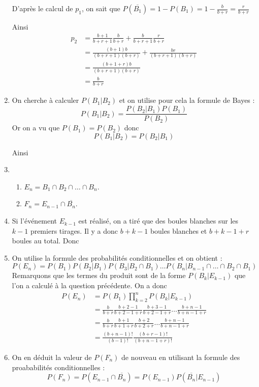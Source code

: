 \begin{exercice}
\begin{correction}
\begin{enumerate}
D'après le calcul de $p_1$, on sait que $P(\overline{B_1})= 1-P(B_1) =1-\frac{b}{b+r}= \frac{r}{b+r}$

Ainsi 
\begin{align*}
p_2&=\frac{b+1}{b+r+1} \frac{b}{b+r} + \frac{b}{b+r+1} \frac{r}{b+r}\\
	&=\frac{(b+1)b}{(b+r+1)(b+r)} + \frac{br}{(b+r+1)(b+r)} \\
	&=\frac{(b+1+r)b}{(b+r+1)(b+r)}  \\
	&=\frac{b}{b+r}  
\end{align*}


\item On cherche à calculer $P(B_1|B_2)$ et on utilise pour cela la formule de Bayes :
$$P(B_1|B_2) =\frac{P(B_2|B_1) P(B_1)}{P(B_2)}$$
Or on a vu que $P(B_1) =P(B_2)$ donc 
$$P(B_1|B_2) =P(B_2|B_1)$$

Ainsi 
\item \begin{enumerate}
\item $E_n = B_1 \cap B_2 \cap \dots \cap B_{n} $. 
\item $F_n =E_{n-1} \cap \overline{B_n}$. 
\end{enumerate}
\item Si l'événement $E_{k-1} $ est réalisé, on a tiré que des boules blanches sur les $k-1$ premiers tirages. Il y a donc $b+k-1$ boules blanches et $b+k-1+r$ boules au total. 
Donc  

\item On utilise la formule des probabilités conditionnelles et on obtient : 
$$P(E_n) = P(B_1) P(B_2|B_1) P(B_3|B_2\cap B_1) \dots  P(B_{n}|B_{n-1}\cap \dots \cap B_2\cap B_1) $$
Remarquons que les termes du produit sont de la forme $P(B_k |E_{k-1})$ que l'on a calculé à la question précédente. On a donc 
\begin{align*}
P(E_n) &=P(B_1) \prod_{k=2}^{n} P(B_k |E_{k-1})\\
			&=\frac{b}{b+r}\frac{b+2-1}{b+2-1+r} \frac{b+3-1}{b+2-1+r}\dots \frac{b+n-1}{b+n-1+r}\\
			&=\frac{b}{b+r}\frac{b+1}{b+1+r} \frac{b+2}{b+2+r}  \dots \frac{b+n-1}{b+n-1+r}\\
			&= \frac{(b+n-1)!}{(b-1)!} \frac{(b+r-1)!}{(b+n-1+r)!} 
\end{align*}


\item On en déduit la valeur de $P(F_n) $ de nouveau en utilisant la formule des proababilités conditionnelles : 
$$P(F_n) =P(E_{n-1}\cap \overline{B_n}) =P(E_{n-1} ) P(\overline{B_n}|E_{n-1})$$


\end{enumerate}
\end{correction}
\end{exercice}
